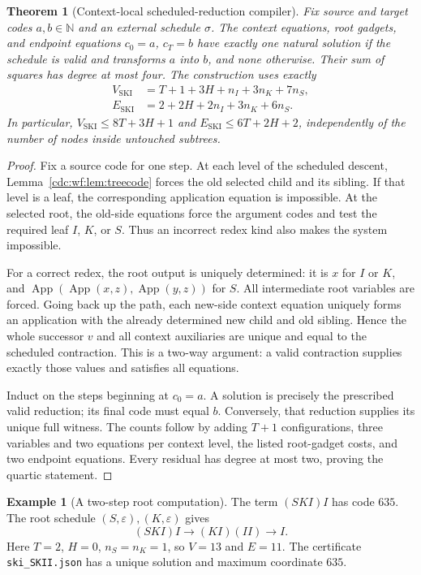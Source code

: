 \documentclass[11pt,a4paper]{article}
\newtheorem{theorem}{Theorem}[section]
\theoremstyle{definition}
\newtheorem{example}[example]{Example}
\theoremstyle{remark}
\newcommand{\N}{\mathbb N}
\newcommand{\App}{\operatorname{App}}
\begin{document}
\begin{theorem}[Context-local scheduled-reduction compiler]\label{cdc:wf:thm:ski}
Fix source and target codes $a,b\in\N$ and an external schedule $\sigma$. The context equations, root gadgets, and endpoint equations $c_0=a$, $c_T=b$ have exactly one natural solution if the schedule is valid and transforms $a$ into $b$, and none otherwise. Their sum of squares has degree at most four. The construction uses exactly
\begin{align}
 V_{\mathrm{SKI}}&=T+1+3H+n_I+3n_K+7n_S,\label{cdc:wf:eq:ski-V}\\
 E_{\mathrm{SKI}}&=2+2H+2n_I+3n_K+6n_S.\label{cdc:wf:eq:ski-E}
\end{align}
In particular, $V_{\mathrm{SKI}}\leq8T+3H+1$ and $E_{\mathrm{SKI}}\leq6T+2H+2$, independently of the number of nodes inside untouched subtrees.
\end{theorem}
\begin{proof}
Fix a source code for one step. At each level of the scheduled descent, Lemma~\ref{cdc:wf:lem:treecode} forces the old selected child and its sibling. If that level is a leaf, the corresponding application equation is impossible. At the selected root, the old-side equations force the argument codes and test the required leaf $I$, $K$, or $S$. Thus an incorrect redex kind also makes the system impossible.

For a correct redex, the root output is uniquely determined: it is $x$ for $I$ or $K$, and $\App(\App(x,z),\App(y,z))$ for $S$. All intermediate root variables are forced. Going back up the path, each new-side context equation uniquely forms an application with the already determined new child and old sibling. Hence the whole successor $v$ and all context auxiliaries are unique and equal to the scheduled contraction. This is a two-way argument: a valid contraction supplies exactly those values and satisfies all equations.

Induct on the steps beginning at $c_0=a$. A solution is precisely the prescribed valid reduction; its final code must equal $b$. Conversely, that reduction supplies its unique full witness. The counts follow by adding $T+1$ configurations, three variables and two equations per context level, the listed root-gadget costs, and two endpoint equations. Every residual has degree at most two, proving the quartic statement.
\end{proof}

\begin{example}[A two-step root computation]
The term $(S K I)I$ has code $635$. The root schedule $(S,\varepsilon),(K,\varepsilon)$ gives
\[
 (S K I)I\longrightarrow (K I)(I I)\longrightarrow I.
\]
Here $T=2$, $H=0$, $n_S=n_K=1$, so $V=13$ and $E=11$. The certificate \texttt{ski\_SKII.json} has a unique solution and maximum coordinate $635$.
\end{example}
\end{document}
